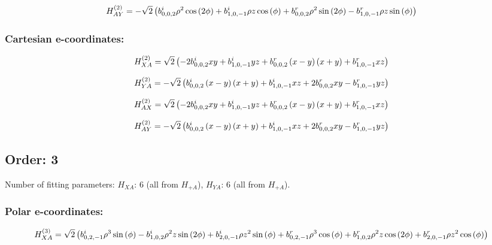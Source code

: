\documentclass[fleqn]{article}
\begin{document}
\begin{dmath*}
H_{AY}^{(2)}=-  \sqrt{2} \left( b^{i}_{0,0,2} \rho^{2} \cos{\left (2 \phi \right )} +  b^{i}_{1,0,-1} \rho z \cos{\left (\phi \right )} +  b^{r}_{0,0,2} \rho^{2} \sin{\left (2 \phi \right )} -  b^{r}_{1,0,-1} \rho z \sin{\left (\phi \right )}\right)\\
\end{dmath*}
\subsubsection*{Cartesian e-coordinates:}

\begin{dmath*}
H_{XA}^{(2)}=\sqrt{2} \left(- 2 b^{i}_{0,0,2} x y + b^{i}_{1,0,-1} y z + b^{r}_{0,0,2} \left(x - y\right) \left(x + y\right) + b^{r}_{1,0,-1} x z\right)\\
\end{dmath*}

\begin{dmath*}
H_{YA}^{(2)}=-  \sqrt{2} \left( b^{i}_{0,0,2} \left(x - y\right) \left(x + y\right) +  b^{i}_{1,0,-1} x z + 2 b^{r}_{0,0,2} x y -  b^{r}_{1,0,-1} y z\right)\\
\end{dmath*}

\begin{dmath*}
H_{AX}^{(2)}=\sqrt{2} \left(- 2 b^{i}_{0,0,2} x y + b^{i}_{1,0,-1} y z + b^{r}_{0,0,2} \left(x - y\right) \left(x + y\right) + b^{r}_{1,0,-1} x z\right)\\
\end{dmath*}

\begin{dmath*}
H_{AY}^{(2)}=-  \sqrt{2} \left( b^{i}_{0,0,2} \left(x - y\right) \left(x + y\right) +  b^{i}_{1,0,-1} x z + 2 b^{r}_{0,0,2} x y -  b^{r}_{1,0,-1} y z\right)\\
\end{dmath*}
\subsection{Order: 3}
Number of fitting parameters: $H_{XA}$: $6$ (all from $H_{+A}$), $H_{YA}$: $6$ (all from $H_{+A}$).
\subsubsection*{Polar e-coordinates:}

\begin{dmath*}
H_{XA}^{(3)}=\sqrt{2} \left(b^{i}_{0,2,-1} \rho^{3} \sin{\left (\phi \right )} - b^{i}_{1,0,2} \rho^{2} z \sin{\left (2 \phi \right )} + b^{i}_{2,0,-1} \rho z^{2} \sin{\left (\phi \right )} + b^{r}_{0,2,-1} \rho^{3} \cos{\left (\phi \right )} + b^{r}_{1,0,2} \rho^{2} z \cos{\left (2 \phi \right )} + b^{r}_{2,0,-1} \rho z^{2} \cos{\left (\phi \right )}\right)\\
\end{dmath*}
\end{document}
